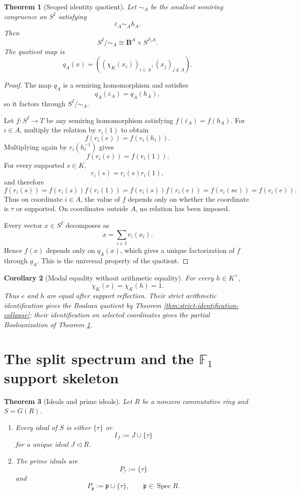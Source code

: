 \documentclass[11pt]{amsart}
\numberwithin{equation}{section}
\newtheorem{theorem}{Theorem}[section]
\newtheorem{corollary}[theorem]{Corollary}
\theoremstyle{definition}
\newcommand{\B}{\mathbf B}
\newcommand{\Spec}{\operatorname{Spec}}
\newcommand{\eps}{\varepsilon}
\begin{document}
\begin{theorem}[Scoped identity quotient]\label{thm:scoped-identity}
Let $\sim_A$ be the smallest semiring congruence on $S^I$ satisfying
\[
\eps_A\sim_A h_A.
\]
Then
\[
S^I/{\sim_A}
\cong
\B^A\times S^{I\setminus A}.
\]
The quotient map is
\[
q_A(x)
=
\left(
(\chi_K(x_i))_{i\in A},
(x_j)_{j\notin A}
\right).
\]
\end{theorem}

\begin{proof}
The map $q_A$ is a semiring homomorphism and satisfies
\[
q_A(\eps_A)=q_A(h_A),
\]
so it factors through $S^I/{\sim_A}$.

Let $f:S^I\to T$ be any semiring homomorphism satisfying $f(\eps_A)=f(h_A)$.  For $i\in A$, multiply the relation by $r_i(1)$ to obtain
\[
f(r_i(e))=f(r_i(h_i)).
\]
Multiplying again by $r_i(h_i^{-1})$ gives
\[
f(r_i(e))=f(r_i(1)).
\]
For every supported $s\in K$,
\[
r_i(s)=r_i(s)r_i(1),
\]
and therefore
\[
f(r_i(s))
=f(r_i(s))f(r_i(1))
=f(r_i(s))f(r_i(e))
=f(r_i(se))
=f(r_i(e)).
\]
Thus on coordinate $i\in A$, the value of $f$ depends only on whether the coordinate is $\tau$ or supported.  On coordinates outside $A$, no relation has been imposed.

Every vector $x\in S^I$ decomposes as
\[
x=\sum_{i\in I}r_i(x_i).
\]
Hence $f(x)$ depends only on $q_A(x)$, which gives a unique factorization of $f$ through $q_A$.  This is the universal property of the quotient.
\end{proof}

\begin{corollary}[Modal equality without arithmetic equality]\label{cor:modal-equality}
For every $h\in K^\times$,
\[
\chi_K(e)=\chi_K(h)=1.
\]
Thus $e$ and $h$ are equal after support reflection.  Their strict arithmetic identification gives the Boolean quotient by Theorem \ref{thm:strict-identification-collapse}; their identification on selected coordinates gives the partial Booleanization of Theorem \ref{thm:scoped-identity}.
\end{corollary}

\section{The split spectrum and the \texorpdfstring{$\mathbb F_1$}{F1} support skeleton}

\begin{theorem}[Ideals and prime ideals]\label{thm:prime-classification}
Let $R$ be a nonzero commutative ring and $S=G(R)$.
\begin{enumerate}[label=\textup{(\alph*)}]
\item Every ideal of $S$ is either $\{\tau\}$ or
\[
I_J:=J\cup\{\tau\}
\]
for a unique ideal $J\triangleleft R$.
\item The prime ideals are
\[
P_\tau:=\{\tau\}
\]
and
\[
P_{\mathfrak p}:=\mathfrak p\cup\{\tau\},
\qquad
\mathfrak p\in\Spec R.
\]
\end{enumerate}
\end{theorem}
\end{document}
